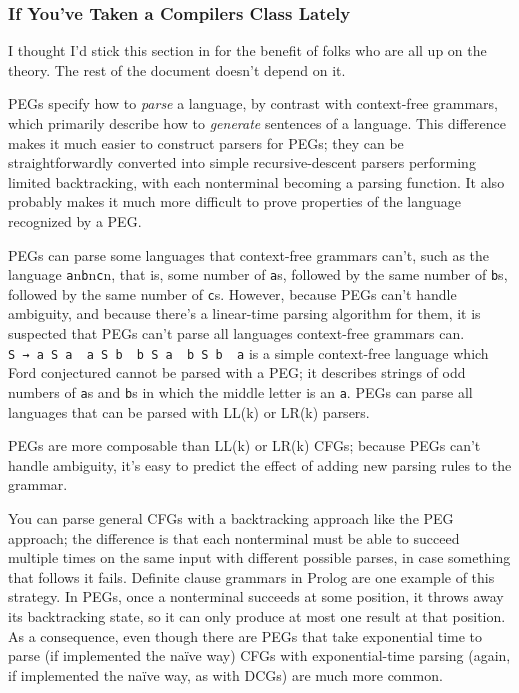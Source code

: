 \documentclass[
]{article}
\begin{document}
\hypertarget{if-youve-taken-a-compilers-class-lately}{%
\subsubsection{If You've Taken a Compilers Class
Lately}\label{if-youve-taken-a-compilers-class-lately}}

I thought I'd stick this section in for the benefit of folks who are all
up on the theory. The rest of the document doesn't depend on it.

PEGs specify how to \emph{parse} a language, by contrast with
context-free grammars, which primarily describe how to \emph{generate}
sentences of a language. This difference makes it much easier to
construct parsers for PEGs; they can be straightforwardly converted into
simple recursive-descent parsers performing limited backtracking, with
each nonterminal becoming a parsing function. It also probably makes it
much more difficult to prove properties of the language recognized by a
PEG.

PEGs can parse some languages that context-free grammars can't, such as
the language \texttt{a}n\texttt{b}n\texttt{c}n, that is, some number of
\texttt{a}s, followed by the same number of \texttt{b}s, followed by the
same number of \texttt{c}s. However, because PEGs can't handle
ambiguity, and because there's a linear-time parsing algorithm for them,
it is suspected that PEGs can't parse all languages context-free
grammars can.
\texttt{S\ →\ a\ S\ a\ \textbar{}\ a\ S\ b\ \textbar{}\ b\ S\ a\ \textbar{}\ b\ S\ b\ \textbar{}\ a}
is a simple context-free language which Ford conjectured cannot be
parsed with a PEG; it describes strings of odd numbers of \texttt{a}s
and \texttt{b}s in which the middle letter is an \texttt{a}. PEGs can
parse all languages that can be parsed with LL(k) or LR(k) parsers.

PEGs are more composable than LL(k) or LR(k) CFGs; because PEGs can't
handle ambiguity, it's easy to predict the effect of adding new parsing
rules to the grammar.

You can parse general CFGs with a backtracking approach like the PEG
approach; the difference is that each nonterminal must be able to
succeed multiple times on the same input with different possible parses,
in case something that follows it fails. Definite clause grammars in
Prolog are one example of this strategy. In PEGs, once a nonterminal
succeeds at some position, it throws away its backtracking state, so it
can only produce at most one result at that position. As a consequence,
even though there are PEGs that take exponential time to parse (if
implemented the naïve way) CFGs with exponential-time parsing (again, if
implemented the naïve way, as with DCGs) are much more common.
\end{document}
